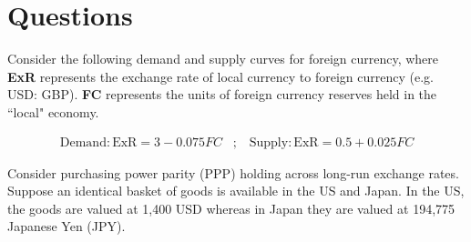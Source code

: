 \documentclass[12pt]{exam}
\begin{document}
\section*{Questions}
\begin{questions}

\question 
Consider the following demand and supply curves for foreign currency, where \textbf{ExR} represents the exchange rate of local currency to foreign currency (e.g. USD: GBP).
\textbf{FC} represents the units of foreign currency reserves held in the ``local" economy.

\begin{align*}
    \text{Demand}: \text{ExR} = 3 - 0.075FC \;\;\; ; \;\;\; \text{Supply}: \text{ExR} = 0.5 + 0.025FC      
\end{align*}


\newpage

\question 
Consider purchasing power parity (PPP) holding across long-run exchange rates. 
Suppose an identical basket of goods is available in the US and Japan. 
In the US, the goods are valued at 1,400 USD whereas in Japan they are valued at 194,775 Japanese Yen (JPY). 

\end{questions}
\end{document}
